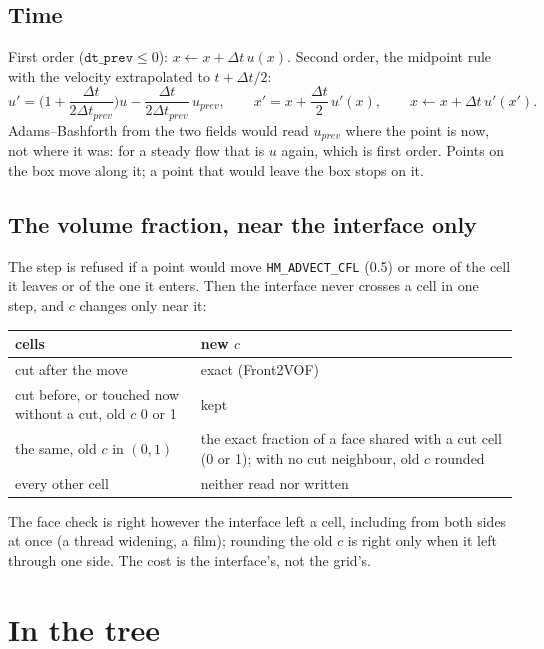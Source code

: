 \documentclass[10pt,a4paper]{article}
\theoremstyle{definition}
\newcommand{\fn}[1]{\texttt{#1}}
\begin{document}
\subsection{Time}

First order ($\fn{dt\_prev} \le 0$): $x \gets x + \Delta t\, u(x)$. Second
order, the midpoint rule with the velocity extrapolated to $t + \Delta t/2$:
\[
  u' = \Big( 1 + \frac{\Delta t}{2 \Delta t_{prev}} \Big) u
    - \frac{\Delta t}{2 \Delta t_{prev}}\, u_{prev}, \qquad
  x' = x + \frac{\Delta t}{2}\, u'(x), \qquad
  x \gets x + \Delta t\, u'(x').
\]
Adams--Bashforth from the two fields would read $u_{prev}$ where the point
is now, not where it was: for a steady flow that is $u$ again, which is
first order. Points on the box move along it; a point that would leave the
box stops on it.

\subsection{The volume fraction, near the interface only}

The step is refused if a point would move \fn{HM\_ADVECT\_CFL} (0.5) or more
of the cell it leaves or of the one it enters. Then the interface never
crosses a cell in one step, and $c$ changes only near it:

\begin{center}
\begin{tabularx}{0.92\textwidth}{@{}>{\raggedright}p{}X@{}}
  \toprule
  cells & new $c$ \\
  \midrule
  cut after the move & exact (Front2VOF) \\
  cut before, or touched now without a cut, old $c$ 0 or 1 & kept \\
  the same, old $c$ in $(0, 1)$ & the exact fraction of a face shared with
    a cut cell (0 or 1); with no cut neighbour, old $c$ rounded \\
  every other cell & neither read nor written \\
  \bottomrule
\end{tabularx}
\end{center}

The face check is right however the interface left a cell, including from
both sides at once (a thread widening, a film); rounding the old $c$ is right
only when it left through one side. The cost is the interface's, not the
grid's.

\section{In the tree}
\label{sec:tree}
\end{document}
